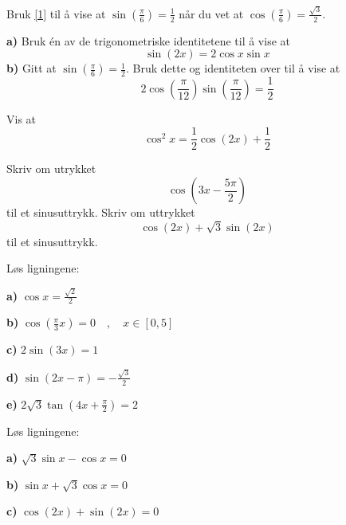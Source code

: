 Bruk \eqref{1} til å vise at $ {\sin\left(\frac{\pi}{6}\right)=\frac{1}{2}} $ når du vet at $ \cos\left(\frac{\pi}{6}\right)=\frac{\sqrt{3}}{2} $.

\textbf{a)} Bruk én av de trigonometriske identitetene til å vise at
\[  \sin (2x)=2\cos x\sin x \]
\textbf{b)} Gitt at $ {\sin \left(\frac{\pi}{6}\right)=\frac{1}{2}} $. Bruk dette og identiteten over til å vise at
\[ 2\cos \left(\frac{\pi}{12}\right)\sin \left(\frac{\pi}{12}\right) = \frac{1}{2} \]

Vis at
\[ \cos^2 x = \frac{1}{2}\cos(2x)+\frac{1}{2} \]


Skriv om utrykket
\[ \cos \left(3x-\frac{5\pi}{2}\right) \]
til et sinusuttrykk.
\newpage
{}
Skriv om uttrykket \[ \cos( 2x) + \sqrt 3\sin (2x) \]
til et sinusuttrykk.

\nes



Løs ligningene:\os

\textbf{a)} $ \cos x=\frac{\sqrt{2}}{2} $\os

\textbf{b)} $ \cos \left(\frac{\pi}{3}x\right) = 0\quad,\quad x\in[0, 5]$\os

\textbf{c)} $ 2\sin(3x)=1 $\os

\textbf{d)} $ \sin(2x-\pi)=-\frac{\sqrt{3}}{2} $\os

\textbf{e)} $ 2\sqrt{3}\tan \left(4x+\frac{\pi}{2}\right) = 2$ \os

Løs ligningene:\os

\textbf{a)} $\sqrt{3} \sin x - \cos x =0$\os

\textbf{b)} $ \sin x + \sqrt{3}\cos x =0$\os

\textbf{c)} $ \cos (2x) + \sin (2x)=0  $\os


